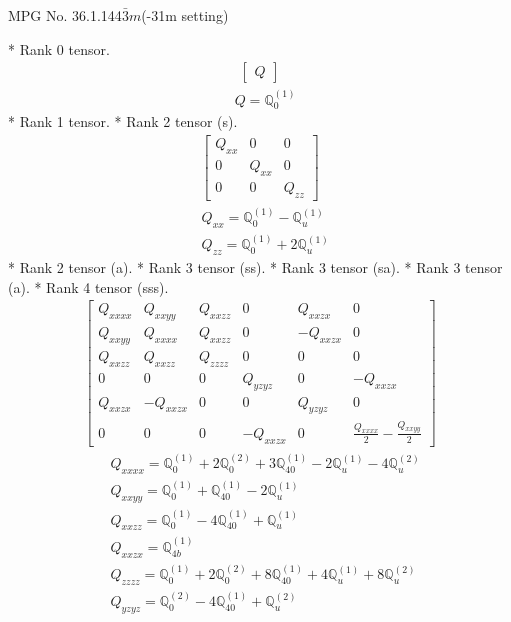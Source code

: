 \documentclass[fleqn,8pt,landscape]{jsarticle}
\begin{document}
\setcounter{MaxMatrixCols}{32}

\renewcommand{\tablename}{Table~}
\renewcommand{\figurename}{Figure~}
\begin{center}
\LARGE
MPG No. 36.1.144\quad$\bar{3}m$\quad(-31m setting)
\end{center}
* Rank 0 tensor.
\begin{align*}
\begin{bmatrix} Q \end{bmatrix}
\end{align*}
\begin{align*}
& Q = \mathbb{Q}_{0}^{(1)}
\end{align*}
* Rank 1 tensor.
* Rank 2 tensor (s).
\begin{align*}
\begin{bmatrix} Q_{xx} & 0 & 0 \\ 0 & Q_{xx} & 0 \\ 0 & 0 & Q_{zz} \end{bmatrix}
\end{align*}
\begin{align*}
& Q_{xx} = \mathbb{Q}_{0}^{(1)} - \mathbb{Q}_{u}^{(1)} \\
& Q_{zz} = \mathbb{Q}_{0}^{(1)} + 2 \mathbb{Q}_{u}^{(1)}
\end{align*}
* Rank 2 tensor (a).
* Rank 3 tensor (ss).
* Rank 3 tensor (sa).
* Rank 3 tensor (a).
* Rank 4 tensor (sss).
\begin{align*}
\begin{bmatrix} Q_{xxxx} & Q_{xxyy} & Q_{xxzz} & 0 & Q_{xxzx} & 0 \\ Q_{xxyy} & Q_{xxxx} & Q_{xxzz} & 0 & - Q_{xxzx} & 0 \\ Q_{xxzz} & Q_{xxzz} & Q_{zzzz} & 0 & 0 & 0 \\ 0 & 0 & 0 & Q_{yzyz} & 0 & - Q_{xxzx} \\ Q_{xxzx} & - Q_{xxzx} & 0 & 0 & Q_{yzyz} & 0 \\ 0 & 0 & 0 & - Q_{xxzx} & 0 & \frac{Q_{xxxx}}{2} - \frac{Q_{xxyy}}{2} \end{bmatrix}
\end{align*}
\begin{align*}
& Q_{xxxx} = \mathbb{Q}_{0}^{(1)} + 2 \mathbb{Q}_{0}^{(2)} + 3 \mathbb{Q}_{40}^{(1)} - 2 \mathbb{Q}_{u}^{(1)} - 4 \mathbb{Q}_{u}^{(2)} \\
& Q_{xxyy} = \mathbb{Q}_{0}^{(1)} + \mathbb{Q}_{40}^{(1)} - 2 \mathbb{Q}_{u}^{(1)} \\
& Q_{xxzz} = \mathbb{Q}_{0}^{(1)} - 4 \mathbb{Q}_{40}^{(1)} + \mathbb{Q}_{u}^{(1)} \\
& Q_{xxzx} = \mathbb{Q}_{4b}^{(1)} \\
& Q_{zzzz} = \mathbb{Q}_{0}^{(1)} + 2 \mathbb{Q}_{0}^{(2)} + 8 \mathbb{Q}_{40}^{(1)} + 4 \mathbb{Q}_{u}^{(1)} + 8 \mathbb{Q}_{u}^{(2)} \\
& Q_{yzyz} = \mathbb{Q}_{0}^{(2)} - 4 \mathbb{Q}_{40}^{(1)} + \mathbb{Q}_{u}^{(2)}
\end{align*}
\end{document}
